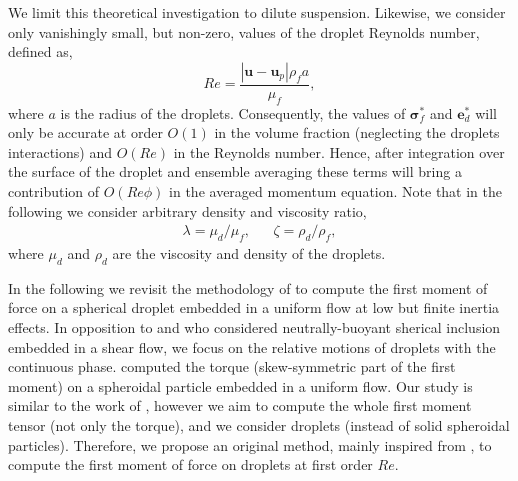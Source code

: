 We limit this theoretical investigation to dilute suspension. 
Likewise, we consider only vanishingly small, but non-zero, values of the droplet Reynolds number, defined as,
\begin{equation}
    Re  = \frac{|\textbf{u} - \textbf{u}_p|\rho_f a}{\mu_f}, 
\end{equation}
where $a$ is the radius of the droplets. 
Consequently, the values of $\bm\sigma_f^*$ and $\textbf{e}_d^*$ will only be accurate at order $O(1)$ in the volume fraction (neglecting the droplets interactions) and $O(Re)$ in the Reynolds number. 
Hence, after integration over the surface of the droplet and ensemble averaging these terms will bring a contribution of $O(Re \phi)$ in the averaged momentum equation. 
Note that in the following we consider arbitrary density and viscosity ratio,
\begin{align}
    \lambda = \mu_d/\mu_f,  && \zeta =\rho_d /\rho_f,
\end{align}
where $\mu_d$ and $\rho_d$ are the viscosity and density of the droplets.

In the following we revisit the methodology of \citet{stone2001inertial,raja2010inertial,dabade2015}  to compute the first moment of force on a spherical droplet embedded in a uniform flow at low but finite inertia effects. 
In opposition to \citet{stone2001inertial} and \citet{raja2010inertial} who considered neutrally-buoyant sherical inclusion embedded in a shear flow, we focus on the relative motions of droplets with the continuous phase. 
\citet{dabade2015} computed the torque (skew-symmetric part of the first moment) on a spheroidal particle embedded in a uniform flow. 
Our study is similar to the work of \citet{dabade2015}, however we aim to compute the whole first moment tensor (not only the torque), and we consider droplets (instead of solid spheroidal particles). 
Therefore, we propose an original method, mainly inspired from \citet{stone2001inertial}, to compute the first moment of force on droplets at first order $Re$.  

